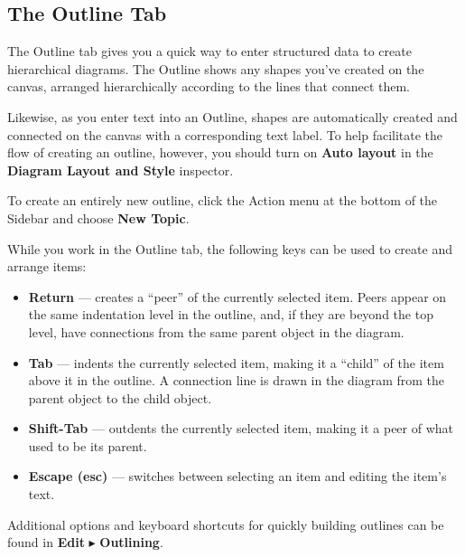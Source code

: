 \documentclass[../main.tex]{subfiles}
\begin{document}

\subsection{The Outline Tab }


The Outline tab gives you a quick way to enter structured data to create hierarchical diagrams.
The Outline shows any shapes you've created on the canvas, arranged hierarchically according
to the lines that connect them.

Likewise, as you enter text into an Outline, shapes are automatically created and connected on
the canvas with a corresponding text label. To help facilitate the flow of creating an
outline, however, you should turn on \textbf{Auto layout} in the \textbf{Diagram Layout and
Style} inspector.


To create an entirely new outline, click the Action menu at the bottom of the Sidebar and choose
\textbf{New Topic}.


While you work in the Outline tab, the following keys can be used to create and arrange items:

\begin{itemize}
  \item \textbf{Return} --- creates a ``peer'' of the currently selected item. Peers appear on
    the same indentation level in the outline, and, if they are beyond the top level, have
    connections from the same parent object in the diagram.
  \item \textbf{Tab} --- indents the currently selected item, making it a ``child'' of the item
    above it in the outline. A connection line is drawn in the diagram from the parent object to
    the child object.
  \item \textbf{Shift-Tab} --- outdents the currently selected item, making it a peer of what
    used to be its parent.
  \item \textbf{Escape (esc)} --- switches between selecting an item and editing the item's
    text.
\end{itemize}

\begin{ognote}
  Additional options and keyboard shortcuts for quickly building outlines can be found in
  \textbf{Edit} $\blacktriangleright$ \textbf{Outlining}.
\end{ognote}
\end{document}
